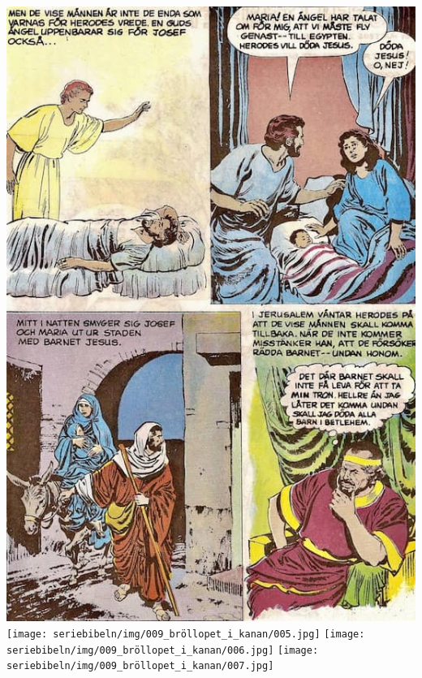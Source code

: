 \includegraphics[width=\textwidth]{seriebibeln/img/008_jul/013.jpg}
\texttt{[image: seriebibeln/img/009\_bröllopet\_i\_kanan/005.jpg]}
\texttt{[image: seriebibeln/img/009\_bröllopet\_i\_kanan/006.jpg]}
\texttt{[image: seriebibeln/img/009\_bröllopet\_i\_kanan/007.jpg]}
